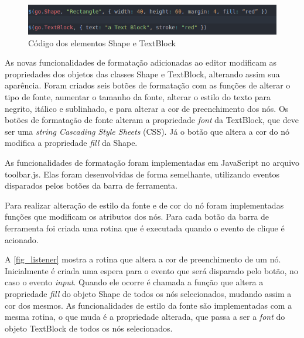 \documentclass[
	12pt,				%
	openright,			%
	oneside,			%
	a4paper,			%
	english,			%
	french,				%
	spanish,			%
	brazil				%
	]{abntex2}
\begin{document}
\begin{figure}[htb]
	\caption{\label{fig_gojselements} Código dos elementos Shape e TextBlock}
	\begin{center}
		\includegraphics[scale=0.6]{gojselements.png}
	\end{center}
\end{figure}

As novas funcionalidades de formatação adicionadas ao editor modificam as propriedades dos objetos das classes Shape e TextBlock, alterando assim sua aparência. Foram criados seis botões de formatação com as funções de alterar o tipo de fonte, aumentar o tamanho da fonte, alterar o estilo do texto para negrito, itálico e sublinhado, e para alterar a cor de preenchimento dos nós. Os botões de formatação de fonte alteram a propriedade \textit{font} da TextBlock, que deve ser uma \textit{string Cascading Style Sheets} (CSS). Já o botão que altera a cor do nó modifica a propriedade \textit{fill} da Shape.

As funcionalidades de formatação foram implementadas em JavaScript no arquivo toolbar.js. Elas foram desenvolvidas de forma semelhante, utilizando eventos disparados pelos botões da barra de ferramenta.

Para realizar alteração de estilo da fonte e de cor do nó foram implementadas funções que modificam os atributos dos nós. Para cada botão da barra de ferramenta foi criada uma rotina que é executada quando o evento de clique é acionado.

A \autoref{fig_listener} mostra a rotina que altera a cor de preenchimento de um nó. Inicialmente é criada uma espera para o evento que será disparado pelo botão, no caso o evento \textit{input}. Quando ele ocorre é chamada a função que altera a propriedade \textit{fill} do objeto Shape de todos os nós selecionados, mudando assim a cor dos mesmos. As funcionalidades de estilo da fonte são implementadas com a mesma rotina, o que muda é a propriedade alterada, que passa a ser a \textit{font} do objeto TextBlock de todos os nós selecionados.    
\end{document}
